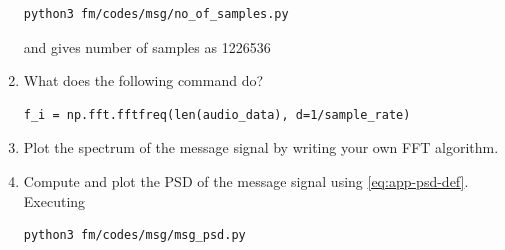 \begin{enumerate}[label=\arabic*.,ref=\thesection.\theenumi]
\begin{lstlisting}
python3 fm/codes/msg/no_of_samples.py
\end{lstlisting}
and gives number of samples as 1226536
\item What does the following command do?
\begin{lstlisting}
f_i = np.fft.fftfreq(len(audio_data), d=1/sample_rate)
\end{lstlisting}
\item Plot the spectrum of the message signal by writing your own FFT algorithm.\\
	\solution

\item Compute and plot the PSD of the message signal using 
\eqref{eq:app-psd-def}.
\\
	\solution
Executing	
\begin{lstlisting}
python3 fm/codes/msg/msg_psd.py
\end{lstlisting}


\end{enumerate}
